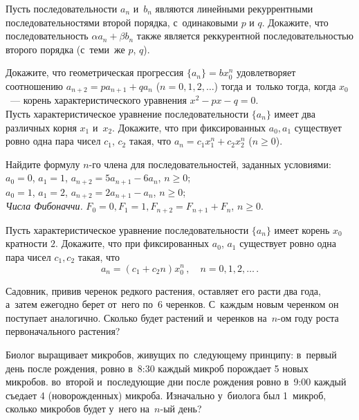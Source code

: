 \begin{problems}

Пусть последовательности $a_{n}$ и~$b_{n}$ являются линейными рекуррентными
последовательностями второй порядка, с~одинаковыми $p$ и $q$.
Докажите, что последовательность $\alpha a_{n} + \beta b_{n}$ также является
реккурентной последовательностью второго порядка (с~теми~же $p$, $q$).

\item
\subproblem
Докажите, что геометрическая прогрессия $\{ a_{n} \} = b x_0^{n}$ удовлетворяет
соотношению $a_{n+2} = p a_{n+1} + q a_{n}$ ($n = 0, 1, 2, \ldots$)
тогда и~только тогда, когда $x_0$~--- корень характеристического уравнения
$x^2 - p x - q = 0$.
\\
\subproblem
Пусть характеристическое уравнение последовательности $\{ a_{n} \}$ имеет два
различных корня $x_1$ и~$x_2$.
Докажите, что при фиксированных $a_{0}, a_{1}$ существует ровно одна пара чисел
$c_1$, $c_2$ такая, что $a_{n} = c_1 x_1^{n} + c_2 x_2^{n}$ ($n \geq 0$).

\item
Найдите формулу $n$-го члена для последовательностей, заданных условиями:
\\
\subproblem
$a_{0} = 0$, $a_{1} = 1$, $a_{n+2} = 5 a_{n+1} - 6 a_{n}$, $n \geq 0$;
\\
\subproblem
$a_{0} = 1$, $a_{1} = 2$, $a_{n+2} = 2 a_{n+1} - a_{n}$, $n \geq 0$;
\\
\subproblem \emph{Числа Фибоначчи.}\enspace
$F_{0} = 0, F_{1} = 1, F_{n+2} = F_{n+1} + F_{n}$, $n \geq 0$.

\item
Пусть характеристическое уравнение последовательности $\{ a_{n} \}$ имеет
корень $x_0$ кратности $2$.
Докажите, что при фиксированных $a_{0}$, $a_{1}$ существует ровно одна пара
чисел $c_1, c_2$ такая, что
\[
    a_{n} = (c_1 + c_2 n) x_0^{n}
\, , \quad
    n = 0, 1, 2, \ldots
\, . \]
\item
Садовник, привив черенок редкого растения, оставляет его расти два года,
а~затем ежегодно берет от~него по~$6$ черенков.
С~каждым новым черенком он поступает аналогично.
Сколько будет растений и~черенков на~$n$-ом году роста первоначального
растения?

\item
Биолог выращивает микробов, живущих по~следующему принципу:
в~первый день после рождения, ровно в~8:30 каждый микроб порождает
5 новых микробов.
во~второй и~последующие дни после рождения ровно в~9:00 каждый съедает
4 (новорожденных) микроба.
Изначально у~биолога был 1~микроб, сколько микробов будет у~него
на~$n$-ый день?


\end{problems}
